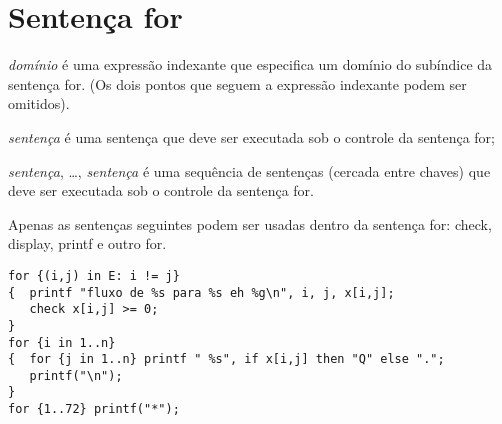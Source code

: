 \documentclass[11pt, brazil]{report}
\def\para#1{\noindent{\bf#1}}
\begin{document}
%
%

\section{Sentença for}

\noindent
{}

\medskip

\noindent
{\it domínio} é uma expressão indexante que especifica um
domínio do subíndice da sentença for. (Os dois pontos que seguem a
expressão indexante podem ser omitidos).

\noindent
{\it sentença} é uma sentença que deve ser executada sob o controle
da sentença for;

\noindent
{\it sentença}, \dots, {\it sentença} é uma sequência de sentenças
(cercada entre chaves) que deve ser executada sob o controle da
sentença for.

Apenas as sentenças seguintes podem ser usadas dentro da
sentença for: check, display, printf e outro for.

\para{Exemplos}

\begin{verbatim}
for {(i,j) in E: i != j}
{  printf "fluxo de %s para %s eh %g\n", i, j, x[i,j];
   check x[i,j] >= 0;
}
for {i in 1..n}
{  for {j in 1..n} printf " %s", if x[i,j] then "Q" else ".";
   printf("\n");
}
for {1..72} printf("*");
\end{verbatim}
\end{document}
